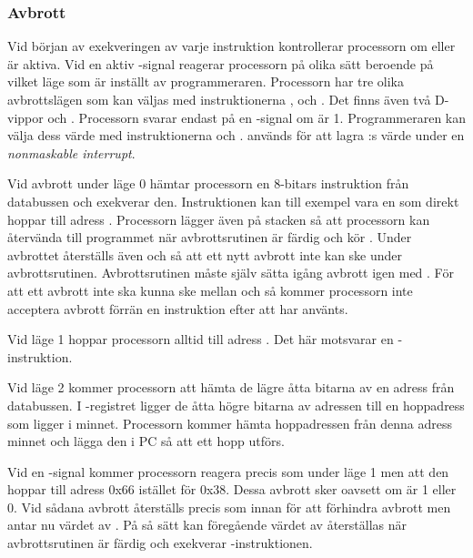 \documentclass[main.tex]{subfiles}
\begin{document}
\subsubsection{Avbrott}
Vid början av exekveringen av varje instruktion kontrollerar processorn om
 eller  är aktiva. Vid en aktiv -signal reagerar
processorn på olika sätt beroende på vilket läge som är inställt av
programmeraren. Processorn har tre olika avbrottslägen som kan väljas med
instruktionerna ,  och . Det finns även två
D-vippor  och . Processorn svarar endast på en
-signal om  är 1. Programmeraren kan välja dess värde med
instruktionerna  och .  används för att lagra
:s värde under en {\it nonmaskable interrupt}.

Vid avbrott under läge 0 hämtar processorn en 8-bitars instruktion från
databussen och exekverar den. Instruktionen kan till exempel vara en  som direkt hoppar till adress . Processorn lägger även
 på stacken så att processorn kan återvända till programmet när
avbrottsrutinen är färdig och kör . Under avbrottet återställs även
 och  så att ett nytt avbrott inte kan ske under
avbrottsrutinen. Avbrottsrutinen måste själv sätta igång avbrott igen med
. För att ett avbrott inte ska kunna ske mellan  och
 så kommer processorn inte acceptera avbrott förrän en instruktion
efter att  har använts.

Vid läge 1 hoppar processorn alltid till adress . Det här
motsvarar en -instruktion.

Vid läge 2 kommer processorn att hämta de lägre åtta bitarna av en adress från
databussen. I -registret ligger de åtta högre bitarna av adressen till
en hoppadress som ligger i minnet. Processorn kommer hämta hoppadressen från
denna adress minnet och lägga den i PC så att ett hopp utförs.

Vid en -signal kommer processorn reagera precis som under läge 1 men
att den hoppar till adress 0x66 istället för 0x38. Dessa avbrott sker oavsett
om  är 1 eller 0. Vid sådana avbrott återställs  precis
som innan för att förhindra avbrott men  antar nu värdet av
. På så sätt kan föregående värdet av  återställas när
avbrottsrutinen är färdig och exekverar -instruktionen.
\end{document}

